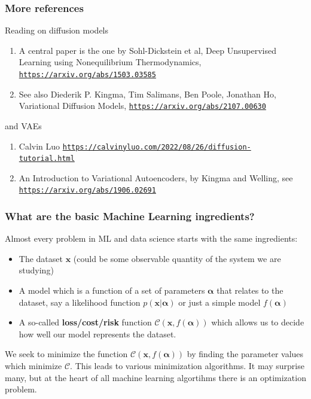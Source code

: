 \documentclass{beamer}
\begin{document}
\begin{frame}
\frametitle{More references}

\begin{block}{Reading on diffusion models }
\begin{enumerate}
\item A central paper is the one by Sohl-Dickstein et al, Deep Unsupervised Learning using Nonequilibrium Thermodynamics, \href{{https://arxiv.org/abs/1503.03585}}{\nolinkurl{https://arxiv.org/abs/1503.03585}}

\item See also Diederik P. Kingma, Tim Salimans, Ben Poole, Jonathan Ho, Variational Diffusion Models, \href{{https://arxiv.org/abs/2107.00630}}{\nolinkurl{https://arxiv.org/abs/2107.00630}}
\end{enumerate}

\noindent
\end{block}   

\begin{block}{and VAEs }
\begin{enumerate}
\item Calvin Luo \href{{https://calvinyluo.com/2022/08/26/diffusion-tutorial.html}}{\nolinkurl{https://calvinyluo.com/2022/08/26/diffusion-tutorial.html}}

\item An Introduction to Variational Autoencoders, by Kingma and Welling, see \href{{https://arxiv.org/abs/1906.02691}}{\nolinkurl{https://arxiv.org/abs/1906.02691}}
\end{enumerate}

\noindent
\end{block}
\end{frame}

\begin{frame}
\frametitle{What are the basic Machine Learning ingredients?}

\begin{block}{}
Almost every problem in ML and data science starts with the same ingredients:
\begin{itemize}
\item The dataset $\bm{x}$ (could be some observable quantity of the system we are studying)

\item A model which is a function of a set of parameters $\bm{\alpha}$ that relates to the dataset, say a likelihood  function $p(\bm{x}\vert \bm{\alpha})$ or just a simple model $f(\bm{\alpha})$

\item A so-called \textbf{loss/cost/risk} function $\mathcal{C} (\bm{x}, f(\bm{\alpha}))$ which allows us to decide how well our model represents the dataset. 
\end{itemize}

\noindent
We seek to minimize the function $\mathcal{C} (\bm{x}, f(\bm{\alpha}))$ by finding the parameter values which minimize $\mathcal{C}$. This leads to  various minimization algorithms. It may surprise many, but at the heart of all machine learning algortihms there is an optimization problem. 
\end{block}
\end{frame}
\end{document}
